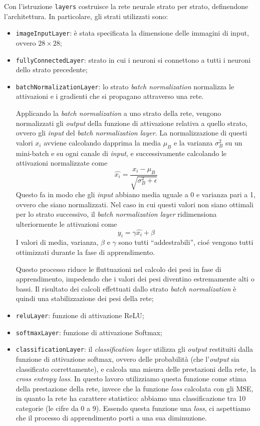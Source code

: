 \documentclass[a4paper,12pt]{article}
\begin{document}
Con l'istruzione \texttt{layers} costruisce la rete neurale strato per strato, definendone l'architettura. In particolare, gli strati utilizzati sono:
\begin{itemize}
    \item \texttt{imageInputLayer}: è stata specificata la dimensione delle immagini di input, ovvero $28\times28$;
    \item \texttt{fullyConnectedLayer}: strato in cui i neuroni si connettono a tutti i neuroni dello strato precedente;
    \item \texttt{batchNormalizationLayer}: lo strato \emph{batch normalization} normalizza le attivazioni e i gradienti che si propagano attraverso una rete. 
    
    Applicando la \emph{batch normalization} a uno strato della rete, vengono normalizzati gli \emph{output} della funzione di attivazione relativa a quello strato, ovvero gli \emph{input} del \emph{batch normalization layer}. La normalizzazione di questi valori $x_i$ avviene calcolando dapprima la media $\mu_B$ e la varianza $\sigma^2_B$ su un mini-batch e su ogni canale di \emph{input}, e successivamente calcolando le attivazioni normalizzate come 
    \[
        \widehat{x_i} = \dfrac{x_i-\mu_B}{\sqrt{\sigma^2_B+\epsilon}}  
    \]
    Questo fa in modo che gli \emph{input} abbiano media uguale a 0 e varianza pari a 1, ovvero che siano normalizzati. Nel caso in cui questi valori non siano ottimali per lo strato successivo, il \emph{batch normalization layer} ridimensiona ulteriormente le attivazioni come
    \[
        y_i = \gamma\widehat{x_i} + \beta       
    \]
    I valori di media, varianza, $\beta$ e $\gamma$ sono tutti ``addestrabili'', cioé vengono tutti ottimizzati durante la fase di apprendimento.

     Questo processo riduce le fluttuazioni nel calcolo dei pesi in fase di apprendimento, impedendo che i valori dei pesi diventino estremamente alti o bassi. Il risultato dei calcoli effettuati dallo strato \emph{batch normalization} è quindi una stabilizzazione dei pesi della rete;
    \item \texttt{reluLayer}: funzione di attivazione ReLU;
    \item \texttt{softmaxLayer}: funzione di attivazione Softmax;
    \item \texttt{classificationLayer}: il \emph{classification layer} utilizza gli \emph{output} restituiti dalla funzione di attivazione softmax, ovvero delle probabilità (che l'\emph{output} sia classificato correttamente), e calcola una misura delle prestazioni della rete, la \emph{cross entropy loss}. In questo lavoro utilizziamo questa funzione come stima della prestazione della rete, invece che la funzione \emph{loss} calcolata con gli MSE, in quanto la rete ha carattere statistico: abbiamo una classificazione tra 10 categorie (le cifre da 0 a 9). Essendo questa funzione una \emph{loss}, ci aspettiamo che il processo di apprendimento porti a una sua diminuzione.
    

\end{itemize}
\end{document}
